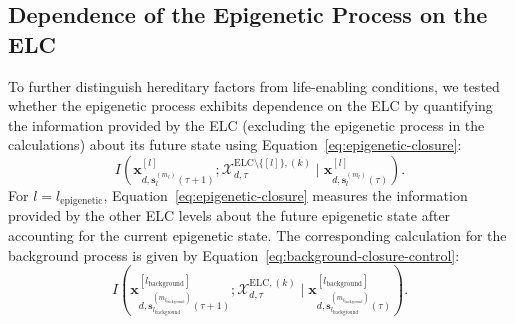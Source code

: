 \documentclass[11pt]{article}
\newcommand{\ELC}{\mathrm{ELC}}
\begin{document}
\subsection{Dependence of the Epigenetic Process on the ELC}
To further distinguish hereditary factors from life-enabling conditions, we tested whether the epigenetic process exhibits dependence on the ELC by quantifying the information provided by the ELC (excluding the epigenetic process in the calculations) about its future state using Equation~\ref{eq:epigenetic-closure}:
\begin{equation}
I\left(
\mathbf{x}^{[l]}_{d,\mathbf{s}^{(m_l)}_l(\tau+1)};
\mathcal{X}^{\ELC\setminus\{[l]\},(k)}_{d,\tau}
\mid
\mathbf{x}^{[l]}_{d,\mathbf{s}^{(m_l)}_l(\tau)}
\right).
\label{eq:epigenetic-closure}
\end{equation}
For $l=l_{\mathrm{epigenetic}}$, Equation~\ref{eq:epigenetic-closure} measures the information provided by the other ELC levels about the future epigenetic state after accounting for the current epigenetic state. The corresponding calculation for the background process is given by Equation~\ref{eq:background-closure-control}:
\begin{equation}
I\left(
\mathbf{x}^{[l_{\mathrm{background}}]}_
{d,\mathbf{s}^{(m_{l_{\mathrm{background}}})}_{l_{\mathrm{background}}}(\tau+1)};
\mathcal{X}^{\ELC,(k)}_{d,\tau}
\mid
\mathbf{x}^{[l_{\mathrm{background}}]}_
{d,\mathbf{s}^{(m_{l_{\mathrm{background}}})}_{l_{\mathrm{background}}}(\tau)}
\right).
\label{eq:background-closure-control}
\end{equation}
\end{document}
